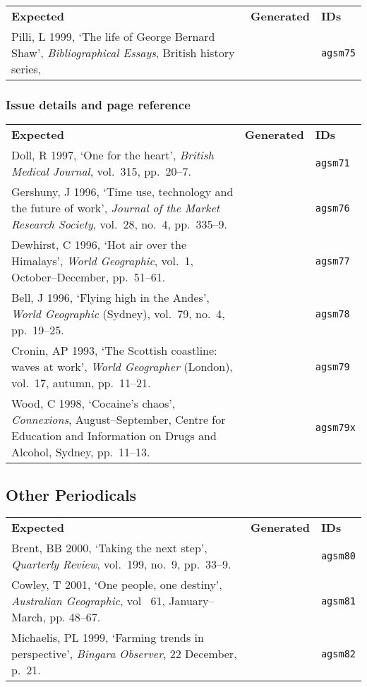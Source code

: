 \documentclass[a4paper,landscape,12pt]{article}
\newlength\q
\newlength\qr
\newenvironment{citetable}
  {\noindent\begin{longtable}{p{\q} p{\q} p{\qr}}\textbf{Expected} & \textbf{Generated} & \textbf{IDs}\\}
  {\end{longtable}}
\begin{document}
\begin{citetable}
	Pilli, L 1999, `The life of George Bernard Shaw', \textit{Bibliographical Essays}, British history series, & \fullcite{agsm75} & \texttt{agsm75} \\
\end{citetable}

\subsubsection{Issue details and page reference}

\begin{citetable}
	Doll, R 1997, `One for the heart', \textit{British Medical Journal}, vol.~315, pp.~20--7. & \fullcite{agsm71} & \texttt{agsm71} \\
	Gershuny, J 1996, `Time use, technology and the future of work', \textit{Journal of the Market Research Society}, vol.~28, no.~4, pp.~335--9. & \fullcite{agsm76} & \texttt{agsm76} \\
	Dewhirst, C 1996, `Hot air over the Himalays', \textit{World Geographic}, vol.~1, October--December, pp.~51--61. & \fullcite{agsm77} & \texttt{agsm77} \\
	Bell, J 1996, `Flying high in the Andes', \textit{World Geographic} (Sydney), vol.~79, no.~4, pp.~19--25. & \fullcite{agsm78} & \texttt{agsm78} \\
	Cronin, AP 1993, `The Scottish coastline: waves at work', \textit{World Geographer} (London), vol.~17, autumn, pp.~11--21. & \fullcite{agsm79} & \texttt{agsm79} \\
	Wood, C 1998, `Cocaine's chaos', \textit{Connexions}, August--September, Centre for Education and Information on Drugs and Alcohol, Sydney, pp.~11--13. & \fullcite{agsm79x} & \texttt{agsm79x} \\
\end{citetable}

\subsection{Other Periodicals}

\begin{citetable}
	Brent, BB 2000, `Taking the next step', \textit{Quarterly Review}, vol.~199, no.~9, pp.~33--9. & \fullcite{agsm80} & \texttt{agsm80} \\
	Cowley, T 2001, `One people, one destiny', \textit{Australian Geographic}, vol~ 61, January--March, pp. 48--67. & \fullcite{agsm81} & \texttt{agsm81} \\
	Michaelis, PL 1999, `Farming trends in perspective', \textit{Bingara Observer}, 22 December, p.~21. & \fullcite{agsm82} & \texttt{agsm82} \\
\end{citetable}
\end{document}
